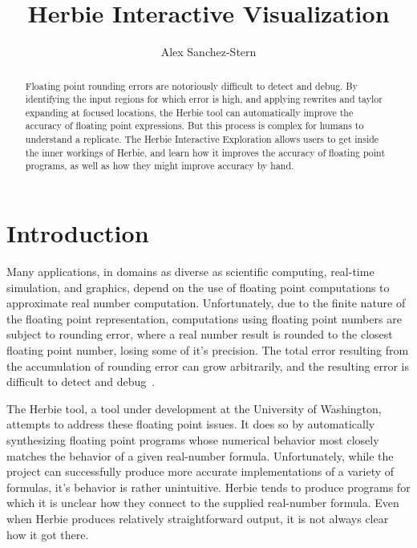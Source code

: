 \documentclass{chi2009}
\begin{document}
\setlength{\paperheight}{11in}
\setlength{\paperwidth}{8.5in}
\setlength{\pdfpageheight}{\paperheight}
\setlength{\pdfpagewidth}{\paperwidth}

\title{Herbie Interactive Visualization}
\author{Alex Sanchez-Stern}

\maketitle

\begin{abstract}
  Floating point rounding errors are notoriously difficult to detect and
  debug. By identifying the input regions for which error is high, and
  applying rewrites and taylor expanding at focused locations, the
  Herbie tool can automatically improve the accuracy of floating point
  expressions. But this process is complex for humans to understand a
  replicate. The Herbie Interactive Exploration allows users to get
  inside the inner workings of Herbie, and learn how it improves the
  accuracy of floating point programs, as well as how they might improve
  accuracy by hand.
\end{abstract}

\section{Introduction}
Many applications, in domains as diverse as scientific computing,
real-time simulation, and graphics, depend on the use of floating
point computations to approximate real number
computation. Unfortunately, due to the finite nature of the floating
point representation, computations using floating point numbers are
subject to rounding error, where a real number result is rounded to
the closest floating point number, losing some of it's precision. The
total error resulting from the accumulation of rounding error can grow
arbitrarily, and the resulting error is difficult to detect and
debug~\cite{berkeley00-needle-like, kahan-java-hurts,
  cse14-practical-fp}.

The Herbie tool, a tool under development at the University of
Washington, attempts to address these floating point issues. It does
so by automatically synthesizing floating point programs whose
numerical behavior most closely matches the behavior of a given
real-number formula. Unfortunately, while the project can successfully
produce more accurate implementations of a variety of formulas, it's
behavior is rather unintuitive. Herbie tends to produce programs for
which it is unclear how they connect to the supplied real-number
formula. Even when Herbie produces relatively straightforward output,
it is not always clear how it got there.
\end{document}
